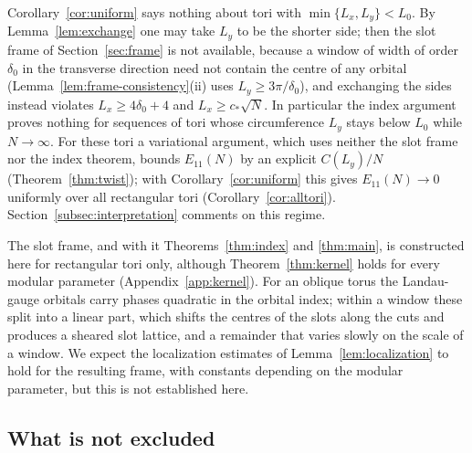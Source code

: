 \begin{remark}\label{rem:thin}
Corollary~\ref{cor:uniform} says nothing about tori with $\min\{L_x,L_y\}<L_0$. By Lemma~\ref{lem:exchange} one may take
$L_y$ to be the shorter side; then the slot frame of Section~\ref{sec:frame} is not available, because a window of
width of order $\delta_0$ in the transverse direction need not contain the centre of any orbital
(Lemma~\ref{lem:frame-consistency}(ii) uses $L_y\ge3\pi/\delta_0$), and exchanging the sides instead violates
$L_x\ge4\delta_0+4$ and $L_x\ge c_*\sqrt N$. In particular the index argument proves nothing for sequences of tori
whose circumference $L_y$ stays below $L_0$ while $N\to\infty$. For these tori a variational argument, which uses neither
the slot frame nor the index theorem, bounds $E_{11}(N)$ by an explicit $C(L_y)/N$ (Theorem~\ref{thm:twist}); with
Corollary~\ref{cor:uniform} this gives $E_{11}(N)\to0$ uniformly over all rectangular tori (Corollary~\ref{cor:alltori}).
Section~\ref{subsec:interpretation} comments on this regime.
\end{remark}

\begin{remark}\label{rem:oblique}
The slot frame, and with it Theorems~\ref{thm:index} and \ref{thm:main}, is constructed here for rectangular tori
only, although Theorem~\ref{thm:kernel} holds for every modular parameter (Appendix~\ref{app:kernel}). For an oblique torus
the Landau-gauge orbitals carry phases quadratic in the orbital index; within a window these split into a linear
part, which shifts the centres of the slots along the cuts and produces a sheared slot lattice, and a remainder
that varies slowly on the scale of a window. We expect the localization estimates of Lemma~\ref{lem:localization}
to hold for the resulting frame, with constants depending on the modular parameter, but this is not
established here.
\end{remark}

\subsection{What is not excluded}

